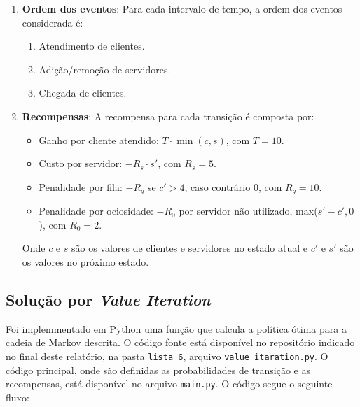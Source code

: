 \begin{enumerate}
    \item \textbf{Ordem dos eventos}: Para cada intervalo de tempo, a ordem dos eventos considerada é:
    \begin{enumerate}[label=\roman*.]
        \item Atendimento de clientes.
        \item Adição/remoção de servidores.
        \item Chegada de clientes.
    \end{enumerate}

    \item \textbf{Recompensas}: A recompensa para cada transição é composta por:
    \begin{itemize}
        \item Ganho por cliente atendido: $T \cdot \min(c, s)$, com $T = 10$.
        \item Custo por servidor: $-R_s \cdot s'$, com $R_s = 5$.
        \item Penalidade por fila: $-R_q$ se $c' > 4$, caso contrário $0$, com $R_q = 10$.
        \item Penalidade por ociosidade: $-R_0$ por servidor não utilizado, max($s' - c', 0$), com $R_0 = 2$.
    \end{itemize}
    Onde $c$ e $s$ são os valores de clientes e servidores no estado atual e $c'$ e $s'$ são os valores no próximo estado.
\end{enumerate}

\subsection*{Solução por \textit{Value Iteration}}

Foi implemmentado em Python uma função que calcula a política ótima para a cadeia de Markov descrita. O código fonte está disponível no repositório indicado no final deste relatório, na pasta \texttt{lista\_6}, arquivo \texttt{value\_itaration.py}. O código principal, onde são definidas as probabilidades de transição e as recompensas, está disponível no arquivo \texttt{main.py}. O código segue o seguinte fluxo:

